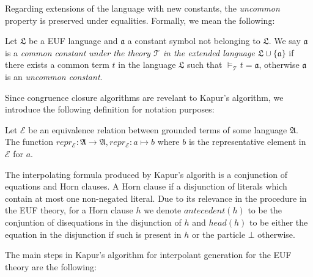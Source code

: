 Regarding extensions of the language with new constants, the \emph{uncommon} property
is preserved under equalities. Formally, we mean the following:

\begin{definition}
  Let $\mathfrak{L}$ be a EUF language and $\mathfrak{a}$ a constant symbol
  not belonging to $\mathfrak{L}$. We say $\mathfrak{a}$ is a \emph{common constant under
  the theory $\mathcal{T}$ in the extended language $\mathfrak{L} \cup \{\mathfrak{a}\}$}
  if there exists a common term $t$ in the language $\mathfrak{L}$ such that 
  $\models_{\mathcal{T}} t = \mathfrak{a}$, otherwise $\mathfrak{a}$ is an \emph{
  uncommon constant}.
\end{definition}

Since congruence closure algorithms are revelant to Kapur's algorithm, we introduce the 
following definition for notation purposes:

\begin{definition}
  Let $\mathcal{E}$ be an equivalence relation between grounded terms of some 
  language $\mathfrak{A}$. The function $repr_{\mathcal{E}} : \mathfrak{A} \rightarrow 
  \mathfrak{A} , repr_{\mathcal{E}} : a \mapsto b$  where $b$ is the representative
  element in $\mathcal{E}$ for $a$.

\end{definition}

The interpolating formula produced by Kapur's algorith is a conjunction of equations
and Horn clauses. A Horn clause if a disjunction of literals which contain at most
one non-negated literal.
Due to its relevance in the procedure in the EUF theory, for a Horn clause $h$
we denote $antecedent(h)$ to be the conjuntion of disequations in the disjunction of $h$ 
and $head(h)$ to be either the equation in the disjunction if such is present in $h$ 
or the particle $\bot$ otherwise.

The main steps in Kapur's algorithm for interpolant generation for the EUF theory
are the following:

